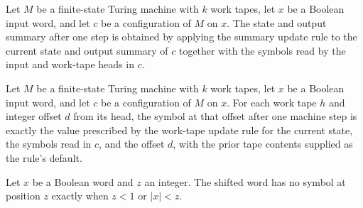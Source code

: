 \begin{theorem}
\label{Complexity.Meyer.SS_step}
\leanok
{}
Let $M$ be a finite-state Turing machine with $k$ work tapes, let $x$ be a Boolean input
word, and let $c$ be a configuration of $M$ on $x$. The state and output summary after
one step is obtained by applying the summary update rule to the current state and output
summary of $c$ together with the symbols read by the input and work-tape heads in $c$.
\end{theorem}

\begin{theorem}
\label{Complexity.Meyer.RW_step}
\leanok
{}
Let $M$ be a finite-state Turing machine with $k$ work tapes, let $x$ be a Boolean input
word, and let $c$ be a configuration of $M$ on $x$. For each work tape $h$ and integer
offset $d$ from its head, the symbol at that offset after one machine step is exactly
the value prescribed by the work-tape update rule for the current state, the symbols
read in $c$, and the offset $d$, with the prior tape contents supplied as the rule's
default.
\end{theorem}

\begin{theorem}
\label{Complexity.Meyer.xhat_eq_none}
\leanok
{}
Let $x$ be a Boolean word and $z$ an integer. The shifted word has no symbol at position
$z$ exactly when $z<1$ or $|x|<z$.
\end{theorem}

